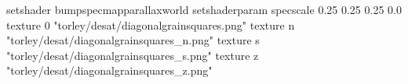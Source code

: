 setshader bumpspecmapparallaxworld
setshaderparam specscale 0.25 0.25 0.25 0.0
texture 0 "torley/desat/diagonalgrainsquares.png"
texture n "torley/desat/diagonalgrainsquares_n.png"
texture s "torley/desat/diagonalgrainsquares_s.png"
texture z "torley/desat/diagonalgrainsquares_z.png"


